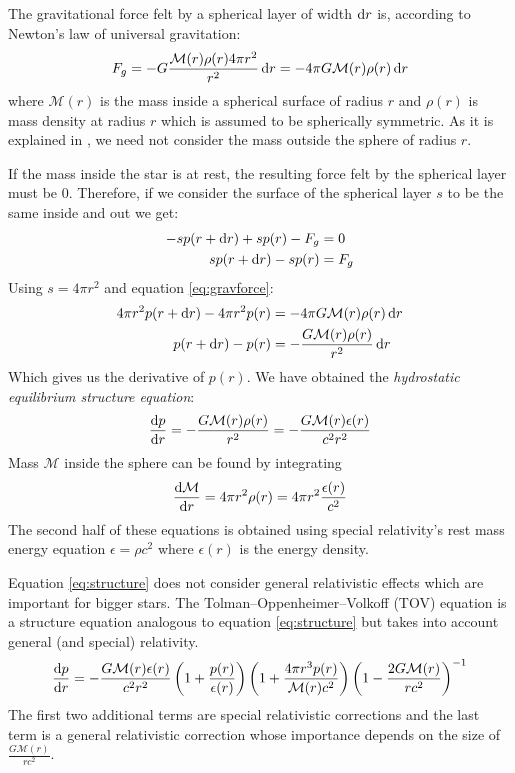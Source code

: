 \documentclass[a4paper]{article}
\newcommand\M{\mathcal{M}}
\begin{document}
 The gravitational force felt by a spherical layer of width $\odif{r}$ is, according to Newton's law of universal gravitation:
 \begin{equation} \label{eq:gravforce}
     F_g=-G\frac{\M(r) \rho(r) 4 \pi r^2}{r^2} \odif{r}=- 4 \pi G \M(r) \rho(r) \odif{r}
 \end{equation}
 where $\M(r)$ is the mass inside a spherical surface of radius $r$ and $\rho(r)$ is mass density at radius $r$ which is assumed to be spherically symmetric.  As it is explained in \cite{tipler_mosca}, we need not consider the mass outside the sphere of radius $r$.
 
 If the mass inside the star is at rest, the resulting force felt by the spherical layer must be 0. Therefore, if we consider the surface of the spherical layer \(s\) to be the same inside and out we get:
 \begin{align*}
      -sp(r+\odif{r})+sp(r) - F_g & = 0 \\
      sp(r+\odif{r})-sp(r) & = F_g
\end{align*}
Using $s=4 \pi r^2$ and equation \eqref{eq:gravforce}:
\begin{align*}
     4 \pi r^2 p(r+\odif{r})- 4 \pi r^2 p(r) & = -4 \pi G \M(r)\rho(r)  \odif{r} \\
     p(r+\odif{r}) -p(r) & = -\frac{G\M(r)\rho(r)}{r^2} \odif{r} \\
 \end{align*}
Which gives us the derivative of $p(r)$. We have obtained the \textit{hydrostatic equilibrium structure equation}:
 \begin{equation} \label{eq:structure}
     \odv{p}{r} = -\frac{G\M(r)\rho(r)}{r^2} = -\frac{G\M(r)\epsilon(r)}{c^2 r^2}
 \end{equation}
 Mass $\M$ inside the sphere can be found by integrating
 \begin{equation} \label{eq:massinsphere}
     \odv{\M}{r} = 4 \pi r^2 \rho(r) = 4 \pi r^2 \frac{\epsilon(r)}{c^2}
 \end{equation}
The second half of these equations is obtained using special relativity's rest mass energy equation $\epsilon = \rho c^2$ where $\epsilon(r)$ is the energy density.

Equation \eqref{eq:structure} does not consider general relativistic effects which are important for bigger stars. The Tolman–Oppenheimer–Volkoff (TOV) equation is a structure equation analogous to equation \eqref{eq:structure} but takes into account general (and special) relativity.
 \begin{equation} \label{eq:tov}
     \odv{p}{r}= -\frac{G\M(r)\epsilon(r)}{c^2 r^2} \left(1+\frac{p(r)}{\epsilon(r)}\right)
     \left(1+\frac{4 \pi r^3 p(r)}{\M(r)c^2}\right)
     \left(1-\frac{2G\M(r)}{rc^2}\right)^{-1}
 \end{equation}
The first two additional terms are special relativistic corrections and the last term is a general relativistic correction whose importance depends on the size of $\frac{G\M(r)}{rc^2}$.
\end{document}
